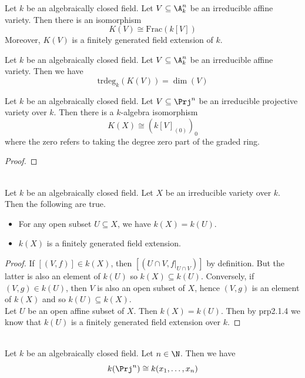 \documentclass[a4paper]{article}
\begin{document}
\begin{prp}{}{} Let $k$ be an algebraically closed field. Let $V\subseteq\A_k^n$ be an irreducible affine variety. Then there is an isomorphism $$K(V)\cong\text{Frac}(k[V])$$ Moreover, $K(V)$ is a finitely generated field extension of $k$. 
\end{prp}

\begin{prp}{}{} Let $k$ be an algebraically closed field. Let $V\subseteq\A_k^n$ be an irreducible affine variety. Then we have $$\text{trdeg}_k(K(V))=\dim(V)$$
\end{prp}

\begin{prp}{}{} Let $k$ be an algebraically closed field. Let $V\subseteq\Prj^n$ be an irreducible projective variety over $k$. Then there is a $k$-algebra isomorphism $$K(X)\cong(k[V]_{(0)})_0$$ where the zero refers to taking the degree zero part of the graded ring. 
\begin{proof}
\end{proof}
\end{prp}

\begin{prp}{}{}\\
Let $k$ be an algebraically closed field. Let $X$ be an irreducible variety over $k$. Then the following are true. 
\begin{itemize}
\item For any open subset $U\subseteq X$, we have $k(X)=k(U)$. 
\item $k(X)$ is a finitely generated field extension. 
\end{itemize}
\begin{proof}
If $[(V,f)]\in k(X)$, then $[(U\cap V,f|_{U\cap V})]$ by definition. But the latter is also an element of $k(U)$ so $k(X)\subseteq k(U)$. Conversely, if $(V,g)\in k(U)$, then $V$ is also an open subset of $X$, hence $(V,g)$ is an element of $k(X)$ and so $k(U)\subseteq k(X)$. \\

Let $U$ be an open affine subset of $X$. Then $k(X)=k(U)$. Then by prp2.1.4 we know that $k(U)$ is a finitely generated field extension over $k$. 
\end{proof}
\end{prp}

\begin{eg}{}{}\\
Let $k$ be an algebraically closed field. Let $n\in\N$. Then we have $$k(\Prj^n)\cong k(x_1,\dots,x_n)$$
\end{eg}
\end{document}
